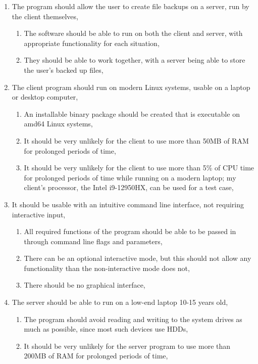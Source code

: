 \documentclass[../main.tex]{subfiles}
\begin{document}
\begin{enumerate}
    \item The program should allow the user to create file backups on a server, run by the client themselves, 
    \begin{enumerate}
        \item The software should be able to run on both the client and server, with appropriate functionality for each situation,
        \item They should be able to work together, with a server being able to store the user’s backed up files, 
    \end{enumerate}
    \item The client program should run on modern Linux systems, usable on a laptop or desktop computer, 
    \begin{enumerate}
        \item An installable binary package should be created that is executable on amd64 Linux systems, 
        \item It should be very unlikely for the client to use more than 50MB of RAM for prolonged periods of time,
        \item It should be very unlikely for the client to use more than 5\% of CPU time for prolonged periods of time while running on a modern laptop; my client's processor, the Intel i9-12950HX, can be used for a test case,
    \end{enumerate}
    \item It should be usable with an intuitive command line interface, not requiring interactive input, 
    \begin{enumerate}
        \item All required functions of the program should be able to be passed in through command line flags and parameters, 
        \item There can be an optional interactive mode, but this should not allow any functionality than the non-interactive mode does not, 
        \item There should be no graphical interface, 
    \end{enumerate}
    \item The server should be able to run on a low-end laptop 10-15 years old, 
    \begin{enumerate}
        \item The program should avoid reading and writing to the system drives as much as possible, since most such devices use HDDs, 
        \item It should be very unlikely for the server program to use more than 200MB of RAM for prolonged periods of time,

\end{enumerate}
\end{enumerate}
\end{document}
